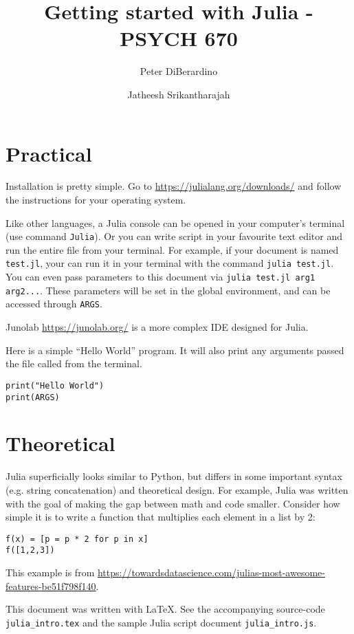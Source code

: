 \documentclass{article}
\title{Getting started with Julia - PSYCH 670}
\author{Peter DiBerardino \and Jatheesh Srikantharajah}
\begin{document}
\maketitle

\section{Practical}
Installation is pretty simple. Go to \url{https://julialang.org/downloads/} and follow the instructions for your operating system.

Like other languages, a Julia console can be opened in your computer's terminal (use command \verb_Julia_). Or you can write script in your favourite text editor and run the entire file from your terminal. For example, if your document is named \verb_test.jl_, your can run it in your terminal with the command \verb_julia test.jl_. You can even pass parameters to this document via \verb_julia test.jl arg1 arg2..._. These parameters will be set in the global environment, and can be accessed through \verb_ARGS_.

Junolab \url{https://junolab.org/} is a more complex IDE designed for Julia.

Here is a simple ``Hello World'' program. It will also print any arguments passed the file called from the terminal.
\begin{verbatim}
print("Hello World")
print(ARGS)

\end{verbatim}

\section{Theoretical}

Julia superficially looks similar to Python, but differs in some important syntax (e.g. string concatenation) and theoretical design. For example, Julia was written with the goal of making the gap between math and code smaller. Consider how simple it is to write a function that multiplies each element in a list by 2:

\begin{verbatim}
f(x) = [p = p * 2 for p in x]
f([1,2,3])
\end{verbatim}
This example is from
\url{https://towardsdatascience.com/julias-most-awesome-features-be51f798f140}.


This document was written with \LaTeX. See the accompanying source-code \verb+julia_intro.tex+ and the sample Julia script document \verb+julia_intro.js+.
\end{document}
